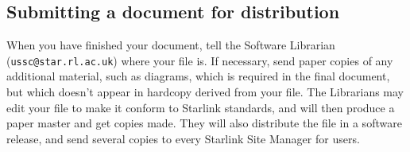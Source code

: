 \subsection{Submitting a document for distribution}

When you have finished your document, tell the Software Librarian
({\tt ussc@star.rl.ac.uk}) where your file is.
If necessary, send paper copies of any additional material, such as diagrams,
which is required in the final document, but which doesn't appear in hardcopy
derived from your file.
The Librarians may edit your file to make it conform to Starlink standards, and
will then produce a paper master and get copies made.
They will also distribute the file in a software release, and send several
copies to every Starlink Site Manager for users.


